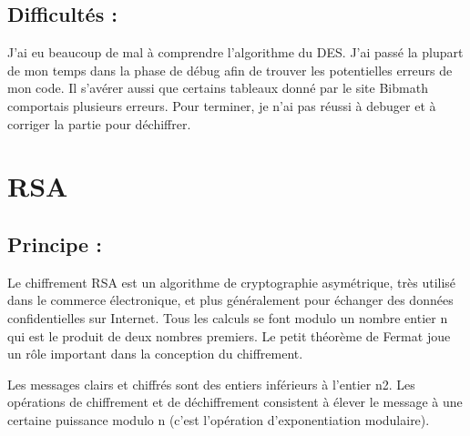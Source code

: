 \documentclass{article}
\begin{document}
\subsection{Difficultés :}
J'ai eu beaucoup de mal à comprendre l'algorithme du DES.
J'ai passé la plupart de mon temps dans la phase de débug afin de trouver les potentielles erreurs de mon code. Il s'avérer aussi que certains tableaux donné par le site Bibmath comportais plusieurs erreurs. 
Pour terminer, je n'ai pas réussi à debuger et à corriger la partie pour déchiffrer.
\newpage
\section{RSA}
\subsection{Principe :}
Le chiffrement RSA est un algorithme de cryptographie asymétrique, très utilisé dans le commerce électronique, et plus généralement pour échanger des données confidentielles sur Internet. Tous les calculs se font modulo un nombre entier n qui est le produit de deux nombres premiers. Le petit théorème de Fermat joue un rôle important dans la conception du chiffrement.

Les messages clairs et chiffrés sont des entiers inférieurs à l'entier n2. Les opérations de chiffrement et de déchiffrement consistent à élever le message à une certaine puissance modulo n (c'est l'opération d'exponentiation modulaire).
\end{document}
